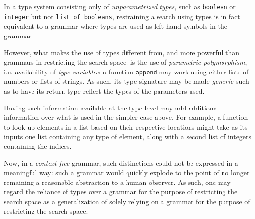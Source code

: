 \documentclass{article}
\begin{document}
In a type system consisting only of \emph{unparametrized types},
such as \verb|boolean| or \verb|integer| but not \verb|list of booleans|,
restraining a search using types is in fact equivalent
to a grammar where types are used as left-hand symbols in the grammar.%

However,
what makes the use of types different from,
and more powerful than grammars in restricting the search space,
is the use of \emph{parametric polymorphism}, i.e. availability of \emph{type variables}:
a function \verb|append| may work using either lists of numbers or lists of strings.
As such, its type signature may be made \emph{generic} such as to have its return type reflect the types of the parameters used.

Having such information available at the type level may add additional information over what is used in the simpler case above.
For example, a function to look up elements in a list based on their respective locations might take as its inputs one list containing any type of element, along with a second list of integers containing the indices.

Now, in a \emph{context-free} grammar,
such distinctions could not be expressed in a meaningful way:
such a grammar would quickly explode to the point of no longer remaining a reasonable abstraction to a human observer.
As such, one may regard the reliance of types over a grammar for the purpose of restricting the search space as a generalization of solely relying on a grammar for the purpose of restricting the search space.%
\end{document}
